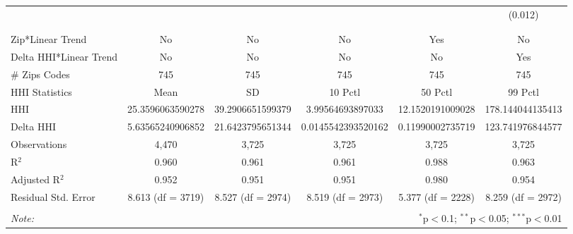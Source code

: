 \begin{table}[H]
{\begin{tabular}{@{\extracolsep{5pt}}lccccc}
   &  &  &  &  & (0.012) \\  

   & & & & & \\  

 \hline \\[-1.8ex]  

 Zip*Linear Trend & No & No & No & Yes & No \\  

 Delta HHI*Linear Trend & No & No & No & No & Yes \\  

 # Zips Codes & 745 & 745 & 745 & 745 & 745 \\  

 HHI Statistics & Mean & SD & 10 Pctl & 50 Pctl & 99 Pctl \\  

 HHI & 25.3596063590278 & 39.2906651599379 & 3.99564693897033 & 12.1520191009028 & 178.144044135413 \\  

 Delta HHI & 5.63565240906852 & 21.6423795651344 & 0.0145542393520162 & 0.11990002735719 & 123.741976844577 \\  

 Observations & 4,470 & 3,725 & 3,725 & 3,725 & 3,725 \\  

 R$^{2}$ & 0.960 & 0.961 & 0.961 & 0.988 & 0.963 \\  

 Adjusted R$^{2}$ & 0.952 & 0.951 & 0.951 & 0.980 & 0.954 \\  

 Residual Std. Error & 8.613 (df = 3719) & 8.527 (df = 2974) & 8.519 (df = 2973) & 5.377 (df = 2228) & 8.259 (df = 2972) \\  

 \hline  

 \hline \\[-1.8ex]  

 \textit{Note:}  & \multicolumn{5}{r}{$^{*}$p$<$0.1; $^{**}$p$<$0.05; $^{***}$p$<$0.01} \\  

 \end{tabular}}  

 \end{table}  

 




